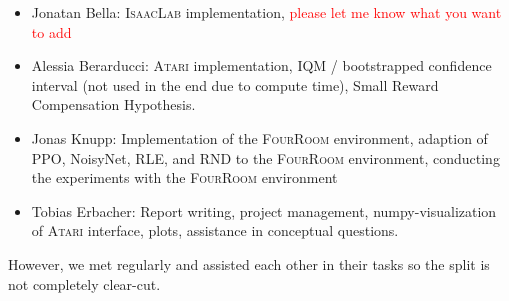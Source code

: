 \documentclass[10pt]{article} %
\begin{document}
\begin{itemize}
  \item Jonatan Bella: \textsc{IsaacLab} implementation, \textcolor{red}{please let me know what you want to add}
  \item Alessia Berarducci: \textsc{Atari} implementation, IQM / bootstrapped confidence interval (not used in the end due to compute time), Small Reward Compensation Hypothesis.
  \item Jonas Knupp: Implementation of the \textsc{FourRoom} environment, adaption of PPO, NoisyNet, RLE, and RND to the \textsc{FourRoom} environment, conducting the experiments with the \textsc{FourRoom} environment
  \item Tobias Erbacher: Report writing, project management, numpy-visualization of \textsc{Atari} interface, plots, assistance in conceptual questions.
\end{itemize}

\noindent However, we met regularly and assisted each other in their tasks so the split is not completely clear-cut.






\end{document}
